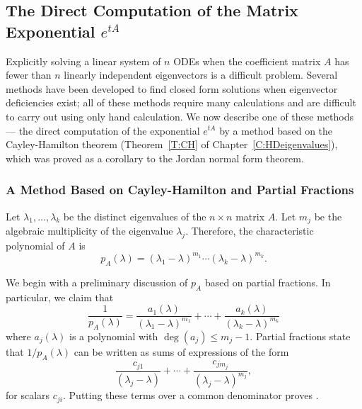 \documentclass{ximera}
\begin{document}
\subsection*{The Direct Computation of the Matrix Exponential $e^{tA}$}

Explicitly solving a linear system of $n$ ODEs when the coefficient 
matrix $A$ has fewer than $n$ linearly independent eigenvectors is 
a difficult problem.  Several methods have been developed to find 
closed form solutions when eigenvector deficiencies exist; all of these 
methods require many calculations and are difficult to carry out using 
only hand calculation.  We now describe one of these methods --- the 
direct computation of the exponential $e^{tA}$ by a method based on the 
Cayley-Hamilton theorem 
(Theorem~\ref{T:CH} of 
Chapter~\ref{C:HDeigenvalues}), which was proved as a corollary to the 
Jordan normal form theorem.

\subsubsection*{A Method Based on Cayley-Hamilton and Partial Fractions}

Let $\lambda_1,\ldots,\lambda_k$ be the distinct eigenvalues of the 
$n\times n$ matrix $A$.  Let $m_j$ be the algebraic multiplicity of the 
eigenvalue $\lambda_j$.  Therefore, the characteristic polynomial
 of $A$ is 
\[
p_A(\lambda) = (\lambda_1-\lambda)^{m_1}\cdots(\lambda_k-\lambda)^{m_k}.
\]

We begin with a preliminary discussion of $p_A$ based on partial fractions.
In particular, we claim that 
\begin{equation}  \label{e:1/p}
\frac{1}{p_A(\lambda)} = \frac{a_1(\lambda)}{(\lambda_1-\lambda)^{m_1}} +\cdots
	+ \frac{a_k(\lambda)}{(\lambda_k-\lambda)^{m_k}}
\end{equation}
where $a_j(\lambda)$ is a polynomial with $\deg(a_j)\leq m_j-1$.  Partial 
fractions state that $1/p_A(\lambda)$ can be written as sums of expressions 
of the form
\[
\frac{c_{j1}}{(\lambda_j-\lambda)} + \cdots + \frac{c_{jm_j}}{(\lambda_j-\lambda)^{m_j}},
\]
for scalars $c_{ji}$.  Putting these terms over a common denominator proves 
.
\end{document}
